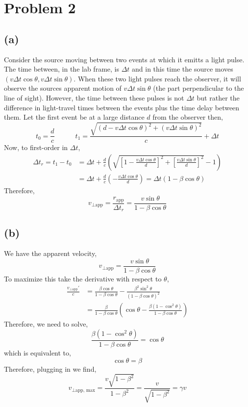 \documentclass[12pt]{article}
\begin{document}
\section{Problem 2}

\subsection*{(a)}

Consider the source moving between two events at which it emitts a light pulse. The time between, in the lab frame, is $\Delta t$ and in this time the source moves $(v \Delta t \cos{\theta}, v \Delta t \sin{\theta})$. When these two light pulses reach the observer, it will observe the sources apparent motion of $v \Delta t \sin{\theta}$ (the part perpendicular to the line of sight). However, the time between these pulses is not $\Delta t$ but rather the difference in light-travel times between the events plus the time delay between them. Let the first event be at a large distance $d$ from the observer then,
\[ t_0 = \frac{d}{c} \quad \quad \quad t_1 = \frac{\sqrt{(d - v \Delta t \cos{\theta})^2 + (v \Delta t \sin{\theta})^2}}{c} + \Delta t \]
Now, to first-order in $\Delta t$,
\begin{align*}
\Delta t_r = t_1 - t_0 & = \Delta t + \frac{d}{c} \left( \sqrt{\left[ 1 - \frac{ v \Delta t \cos{\theta}}{d} \right]^2 + \left[ \frac{v \Delta t \sin{\theta}}{d} \right]^2} - 1 \right)
\\
& = \Delta t + \frac{d}{c} \left( - \frac{v \Delta t \cos{\theta}}{d} \right) = \Delta t ( 1 - \beta \cos{\theta}) 
\end{align*}
Therefore,
\[ v_{\perp \text{app}} = \frac{r_{\text{app}}}{\Delta t_r} = \frac{v \sin{\theta}}{1 - \beta \cos{\theta}} \] 

\subsection*{(b)}

We have the apparent velocity,
\[ v_{\perp \text{app}} = \frac{v \sin{\theta}}{1 - \beta \cos{\theta}} \]
To maximize this take the derivative with respect to $\theta$,
\begin{align*}
\frac{v_{\perp \text{app}}'}{c} & = \frac{\beta \cos{\theta}}{1 - \beta \cos{\theta}} - \frac{\beta^2 \sin^2{\theta}}{(1 - \beta \cos{\theta})^2}
\\
& = \frac{\beta}{1 - \beta \cos{\theta}} \left( \cos{\theta} - \frac{\beta (1 - \cos^2{\theta})}{1 - \beta \cos{\theta}} \right)
\end{align*}
Therefore, we need to solve,
\[ \frac{\beta (1 - \cos^2{\theta})}{1 - \beta \cos{\theta}} = \cos{\theta} \]
which is equivalent to,
\[ \cos{\theta} = \beta \] 
Therefore, plugging in we find,
\[ v_{\perp \text{app, max}} = \frac{v \sqrt{1 - \beta^2}}{1 - \beta^2} = \frac{v}{\sqrt{1 - \beta^2}} = \gamma v \]
\end{document}

